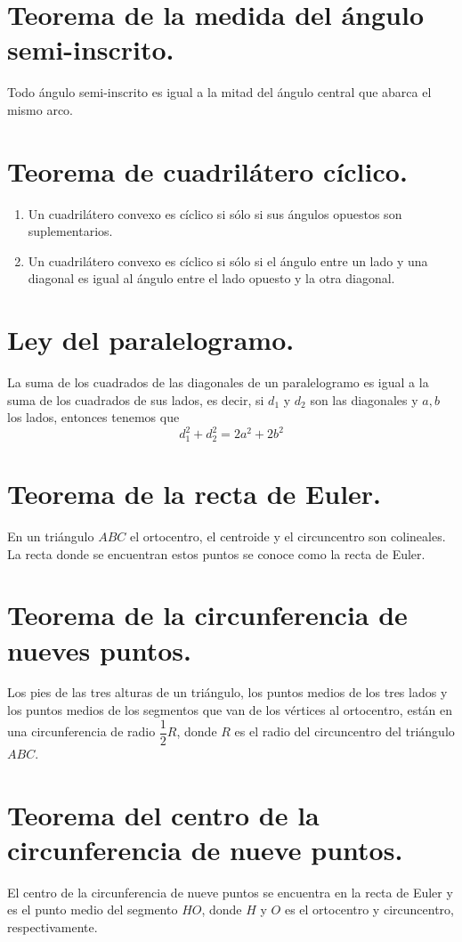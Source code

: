 \documentclass[12pt,a4paper,oneside]{book}
\begin{document}
\section{Teorema de la medida del ángulo semi-inscrito.}
Todo ángulo semi-inscrito es igual a la mitad del ángulo central que abarca el mismo arco.
\section{Teorema de cuadrilátero cíclico.}
\begin{enumerate}
\item Un cuadrilátero convexo es cíclico si sólo si sus ángulos opuestos son suplementarios.
\item Un cuadrilátero convexo es cíclico si sólo si el ángulo entre un lado y una diagonal es igual al ángulo entre el lado opuesto y la otra diagonal.
\end{enumerate}
\section{Ley del paralelogramo.}
La suma de los cuadrados de las diagonales de un paralelogramo es igual a la suma de los cuadrados de sus lados, es decir, si $d_1$ y $d_2$ son las diagonales y $a, b$ los lados, entonces tenemos que 
$$d_1^2 + d_2^2=2a^2+2b^2$$
\section{Teorema de la recta de Euler.}
En un triángulo $ABC$ el ortocentro, el centroide y el circuncentro son colineales. La recta donde se encuentran estos puntos se conoce como la recta de Euler.
\section{Teorema de la circunferencia de nueves puntos.}
Los pies de las tres alturas de un triángulo, los puntos medios de los tres lados y los puntos medios de los segmentos que van de los vértices al ortocentro, están en una circunferencia de radio $\dfrac{1}{2}R$, donde $R$ es el radio del circuncentro del triángulo $ABC$.
\section{Teorema del centro de la circunferencia de nueve puntos.}
El centro de la circunferencia de nueve puntos se encuentra en la recta de Euler y es el punto medio del segmento $HO$, donde $H$ y $O$ es el ortocentro y circuncentro, respectivamente.
\end{document}
